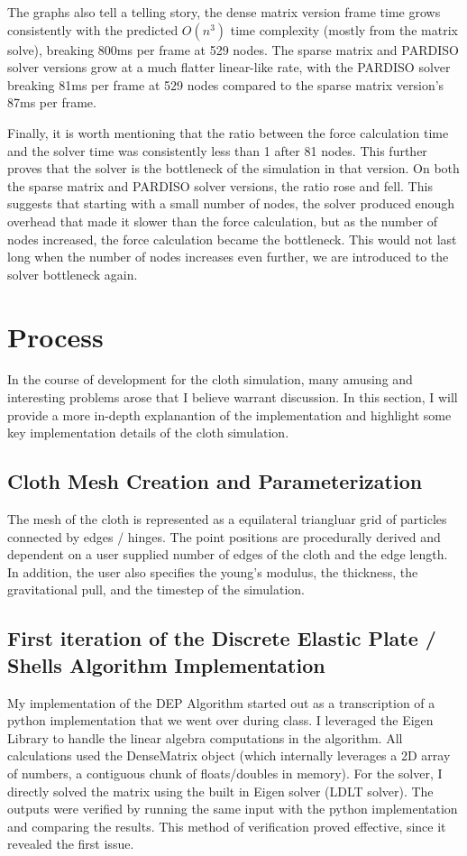 \documentclass[letterpaper, 10 pt, conference]{ieeeconf}  %
\begin{document}
The graphs also tell a telling story, the dense matrix version frame time grows consistently with the predicted $O(n^3)$ time complexity (mostly from the matrix solve), breaking 800ms per frame at 529 nodes. The sparse matrix and PARDISO solver versions grow at a much flatter linear-like rate, with the PARDISO solver breaking 81ms per frame at 529 nodes compared to the sparse matrix version's 87ms per frame.

Finally, it is worth mentioning that the ratio between the force calculation time and the solver time was consistently less than 1 after 81 nodes. This further proves that the solver is the bottleneck of the simulation in that version. On both the sparse matrix and PARDISO solver versions, the ratio rose and fell. This suggests that starting with a small number of nodes, the solver produced enough overhead that made it slower than the force calculation, but as the number of nodes increased, the force calculation became the bottleneck. This would not last long when the number of nodes increases even further, we are introduced to the solver bottleneck again.

\section{Process}
 In the course of development for the cloth simulation, many amusing and interesting problems arose that I believe warrant discussion. In this section, I will provide a more in-depth explanantion of the implementation and highlight some key implementation details of the cloth simulation.

\subsection{Cloth Mesh Creation and Parameterization}
The mesh of the cloth is represented as a equilateral triangluar grid of particles connected by edges / hinges. The point positions are procedurally derived and dependent on a user supplied number of edges of the cloth and the edge length. In addition, the user also specifies the young's modulus, the thickness, the gravitational pull, and the timestep of the simulation.

\subsection{First iteration of the Discrete Elastic Plate / Shells Algorithm Implementation}

My implementation of the DEP Algorithm started out as a transcription of a python implementation that we went over during class. I leveraged the Eigen Library \cite{eigen_library} to handle the linear algebra computations in the algorithm. All calculations used the DenseMatrix object (which internally leverages a 2D array of numbers, a contiguous chunk of floats/doubles in memory). For the solver, I directly solved the matrix using the built in Eigen solver (LDLT solver). The outputs were verified by running the same input with the python implementation and comparing the results. This method of verification proved effective, since it revealed the first issue. 
\end{document}
